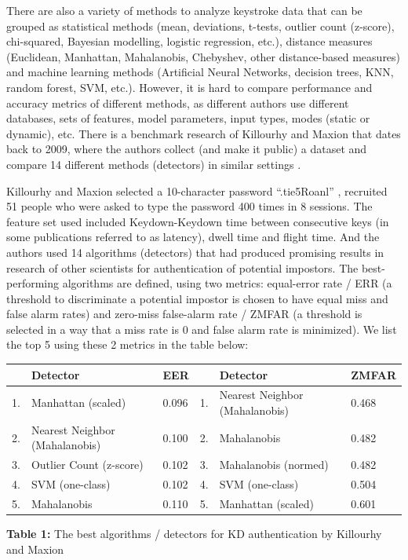 \documentclass[12pt,a4]{article}
\begin{document}
There are also a variety of methods to analyze keystroke data that can be grouped as statistical methods (mean, deviations, t-tests, outlier count (z-score), chi-squared, Bayesian modelling, logistic regression, etc.), distance measures (Euclidean, Manhattan, Mahalanobis, Chebyshev, other distance-based measures) and machine learning methods (Artificial Neural Networks, decision trees, KNN, random forest, SVM, etc.). However, it is hard to compare performance and accuracy metrics of different methods, as different authors use different databases, sets of features, model parameters, input types, modes (static or dynamic), etc. There is a benchmark research of Killourhy and Maxion that dates back to 2009, where the authors collect (and make it public) a dataset and compare 14 different methods (detectors) in similar settings \cite{killourhy2009comparing}.

Killourhy and Maxion selected  a 10-character password “.tie5Roanl” , recruited 51 people who were asked to type the password 400 times in 8 sessions. The feature set used included  Keydown-Keydown time between consecutive keys (in some publications referred to as latency), dwell time and flight time. And the authors used 14 algorithms (detectors) that had produced promising results in research of other scientists for authentication of potential impostors. The best-performing algorithms are defined, using two metrics: equal-error rate / ERR (a threshold to discriminate a potential impostor is chosen to have equal miss and false alarm rates) and zero-miss false-alarm rate / ZMFAR (a threshold is selected in a way that a miss rate is 0 and false alarm rate is minimized). We list the top 5 using these 2 metrics in the table below:

\begin{center}

\begin{tabular*}{\textwidth}{l @{\extracolsep{\fill}} lllll}

\hline
 & \textbf{Detector} & \textbf{EER} & & \textbf{Detector} & \textbf{ZMFAR} \\
 \hline
1. & Manhattan (scaled) & 0.096 & 1. & Nearest Neighbor (Mahalanobis) & 0.468 \\ 
\hline
2. & Nearest Neighbor (Mahalanobis) & 0.100 & 2. & Mahalanobis & 0.482 \\ 
\hline
3. & Outlier Count (z-score) & 0.102 & 3. & Mahalanobis (normed) & 0.482 \\

\hline
4. & SVM (one-class) & 0.102 & 4. & SVM (one-class) & 0.504 \\
\hline
5. & Mahalanobis & 0.110 & 5. & Manhattan (scaled) & 0.601 \\
\hline
\end{tabular*}
\textbf{Table 1:} The best algorithms / detectors for KD authentication by Killourhy and Maxion
\end{center}
\end{document}
